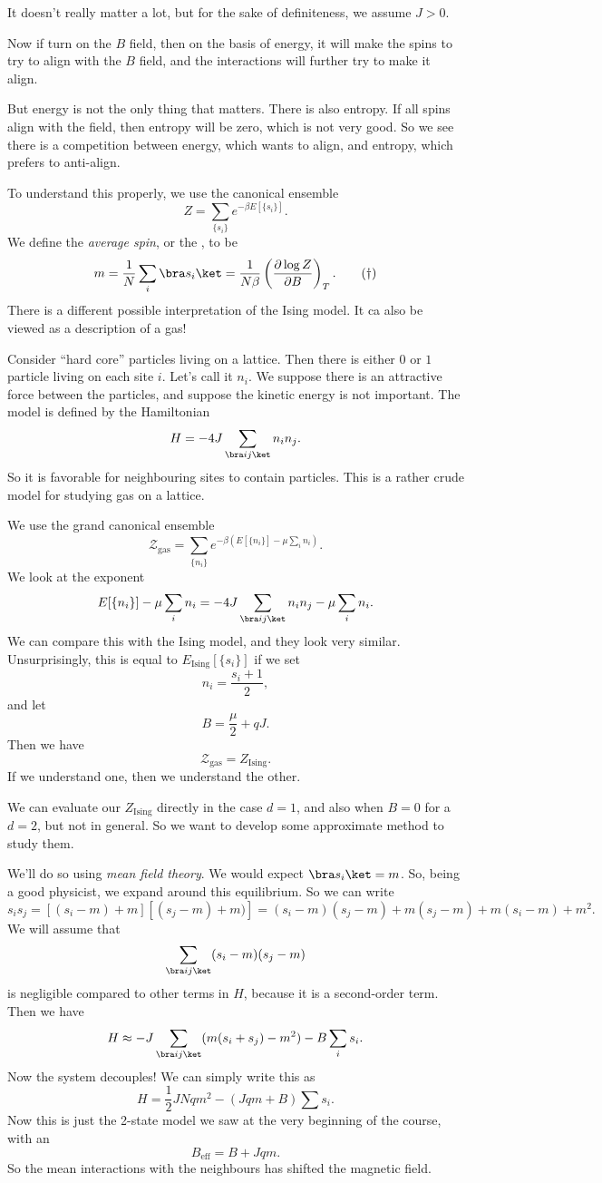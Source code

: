 \documentclass[a4paper]{article}
\begin{document}
It doesn't really matter a lot, but for the sake of definiteness, we assume $J > 0$.

Now if turn on the $B$ field, then on the basis of energy, it will make the spins to try to align with the $B$ field, and the interactions will further try to make it align.

But energy is not the only thing that matters. There is also entropy. If all spins align with the field, then entropy will be zero, which is not very good. So we see there is a competition between energy, which wants to align, and entropy, which prefers to anti-align.

To understand this properly, we use the canonical ensemble
\[
  Z = \sum_{\{s_i\}} e^{-\beta E[\{s_i\}]}.
\]
We define the \emph{average spin}, or the , to be
\[
  m = \frac{1}{N} \sum_i \bra s_i\ket = \frac{1}{N\beta} \left(\frac{\partial \log Z}{\partial B}\right)_T.\tag{$\dagger$}
\]
There is a different possible interpretation of the Ising model. It ca also be viewed as a description of a gas!

Consider ``hard core'' particles living on a lattice. Then there is either $0$ or $1$ particle living on each site $i$. Let's call it $n_i$. We suppose there is an attractive force between the particles, and suppose the kinetic energy is not important. The model is defined by the Hamiltonian
\[
  H = - 4J \sum_{\bra ij\ket} n_i n_j.
\]
So it is favorable for neighbouring sites to contain particles. This is a rather crude model for studying gas on a lattice.

We use the grand canonical ensemble
\[
  \mathcal{Z}_{\mathrm{gas}} = \sum_{\{n_i\}} e^{-\beta (E [\{n_i\}] - \mu \sum_i n_i)}.
\]
We look at the exponent
\[
  E[\{n_i\}] - \mu \sum_i n_i = -4J \sum_{\bra ij\ket }n_i n_j - \mu \sum_i n_i.
\]
We can compare this with the Ising model, and they look very similar. Unsurprisingly, this is equal to $E_{\mathrm{Ising}} [\{s_i\}]$ if we set
\[
  n_i = \frac{s_i + 1}{2},
\]
and let
\[
  B = \frac{\mu}{2} + qJ.
\]
Then we have
\[
  \mathcal{Z}_{\mathrm{gas}} = Z_{\mathrm{Ising}}.
\]
If we understand one, then we understand the other.

We can evaluate our $Z_{\mathrm{Ising}}$ directly in the case $d = 1$, and also when $B = 0$ for a $d = 2$, but not in general. So we want to develop some approximate method to study them.

We'll do so using \emph{mean field theory}. We would expect $\bra s_i\ket = m$. So, being a good physicist, we expand around this equilibrium. So we can write
\[
  s_i s_j = [(s_i - m) + m][(s_j - m) + m)] = (s_i - m)(s_j - m) + m (s_j - m) + m (s_i - m) + m^2.
\]
We will assume that
\[
  \sum_{\bra ij\ket} (s_i - m)(s_j - m)
\]
is negligible compared to other terms in $H$, because it is a second-order term. Then we have
\[
  H \approx - J \sum_{\bra i j\ket} (m(s_i + s_j) - m^2) - B \sum_i s_i.
\]
Now the system decouples! We can simply write this as
\[
  H = \frac{1}{2} J N qm^2 - (Jqm + B) \sum s_i.
\]
Now this is just the 2-state model we saw at the very beginning of the course, with an 
\[
  B_{\mathrm{eff}} = B + J qm.
\]
So the mean interactions with the neighbours has shifted the magnetic field.
\end{document}

